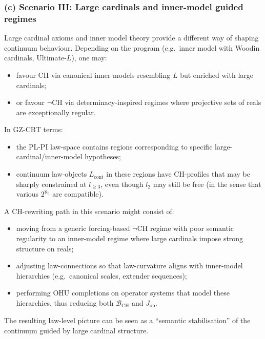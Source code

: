 \documentclass[11pt]{book}
\theoremstyle{plain}
\theoremstyle{definition}
\begin{document}
\subsubsection*{(c) Scenario III: Large cardinals and inner-model guided regimes}

Large cardinal axioms and inner model theory provide a different way of
shaping continuum behaviour. Depending on the program (e.g.\ inner
model with Woodin cardinals, Ultimate-$L$), one may:

\begin{itemize}
  \item favour CH via canonical inner models resembling $L$ but enriched
        with large cardinals;
  \item or favour $\neg\mathrm{CH}$ via determinacy-inspired regimes
        where projective sets of reals are exceptionally regular.
\end{itemize}

In GZ-CBT terms:

\begin{itemize}
  \item the PL-PI law-space contains regions corresponding to specific
        large-cardinal/inner-model hypotheses;
  \item continuum law-objects $L_{\mathrm{cont}}$ in these regions have
        CH-profiles that may be sharply constrained at $l_{\ge3}$, even
        though $l_2$ may still be free (in the sense that various
        $2^{\aleph_0}$ are compatible).
\end{itemize}

A CH-rewriting path in this scenario might consist of:

\begin{itemize}
  \item moving from a generic forcing-based $\neg\mathrm{CH}$ regime
        with poor semantic regularity to an inner-model regime where
        large cardinals impose strong structure on reals;
  \item adjusting law-connections so that law-curvature aligns with
        inner-model hierarchies (e.g.\ canonical scales, extender
        sequences);
  \item performing OHU completions on operator systems that model
        these hierarchies, thus reducing both
        $\mathcal{B}_{\mathrm{CH}}$ and $J_{\mathrm{op}}$.
\end{itemize}

The resulting law-level picture can be seen as a “semantic
stabilisation” of the continuum guided by large cardinal structure.
\end{document}
